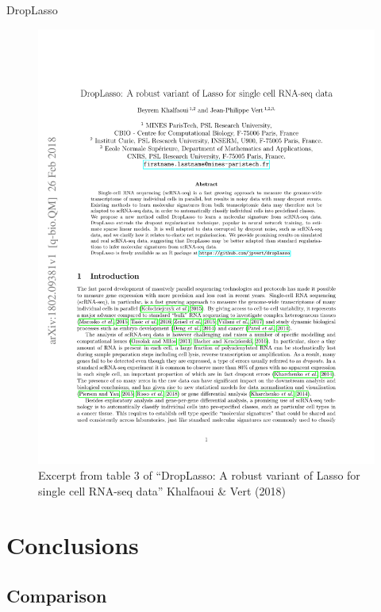 \documentclass{beamer}
\begin{document}
\begin{frame}{DropLasso}

\begin{figure}[H]
  \includegraphics[width=\textwidth]{droplasso}
  \caption{Excerpt from table 3 of ``DropLasso: A robust variant of Lasso for
    single cell RNA-seq data'' Khalfaoui \& Vert (2018)}
\end{figure}

\end{frame}

\section{Conclusions}
\subsection{Comparison}
\end{document}
